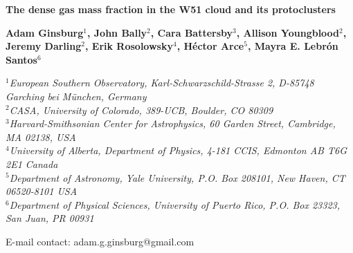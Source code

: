 \documentclass[]{article}
\newcommand{\eso}{$^{1}$}
\newcommand{\casa}{$^{2}$}
\newcommand{\cfa}{$^{3}$}
\newcommand{\edmonton}{$^{4}$}
\newcommand{\yale}{$^{5}$}
\newcommand{\puertorico}{$^{6}$}
\begin{document}
{\large\bf{The dense gas mass fraction in the W51 cloud and its protoclusters}}

{\bf{
Adam Ginsburg{\eso},
John Bally{\casa},
Cara Battersby{\cfa},
Allison Youngblood{\casa},
Jeremy Darling{\casa},
Erik Rosolowsky{\edmonton},
Héctor Arce{\yale},
Mayra E. Lebrón Santos{\puertorico}
}}

{\eso}{\it{European Southern Observatory, Karl-Schwarzschild-Strasse 2, D-85748 Garching bei München, Germany }} \\ 
{\casa}{\it{CASA, University of Colorado, 389-UCB, Boulder, CO 80309}} \\ 
{\cfa}{\it{Harvard-Smithsonian Center for Astrophysics, 60 Garden Street, Cambridge, MA 02138, USA}} \\ 
{\edmonton}{\it{University of Alberta, Department of Physics, 4-181 CCIS, Edmonton AB T6G 2E1 Canada}} \\ 
{\yale}{\it{Department of Astronomy, Yale University, P.O. Box 208101, New Haven, CT 06520-8101 USA}} \\ 
{\puertorico}{\it{Department of Physical Sciences, University of Puerto Rico, P.O. Box 23323, San Juan, PR 00931}}


{E-mail contact: adam.g.ginsburg@gmail.com}



\newcommand{\percc}{\ensuremath{\textrm{cm}^{-3}}\xspace}
\newcommand{\formaldehyde}{\ensuremath{\textrm{H}_2\textrm{CO}}\xspace}
\newcommand{\hh}{\ensuremath{\textrm{H}_{2}}\xspace}			%
\newcommand{\hii}{H~{\sc ii}\xspace}
\def\ee#1{\ensuremath{\times10^{#1}}}
\newcommand\arcsec{\mbox{$^{\prime\prime}$}\xspace} 

\end{document}

